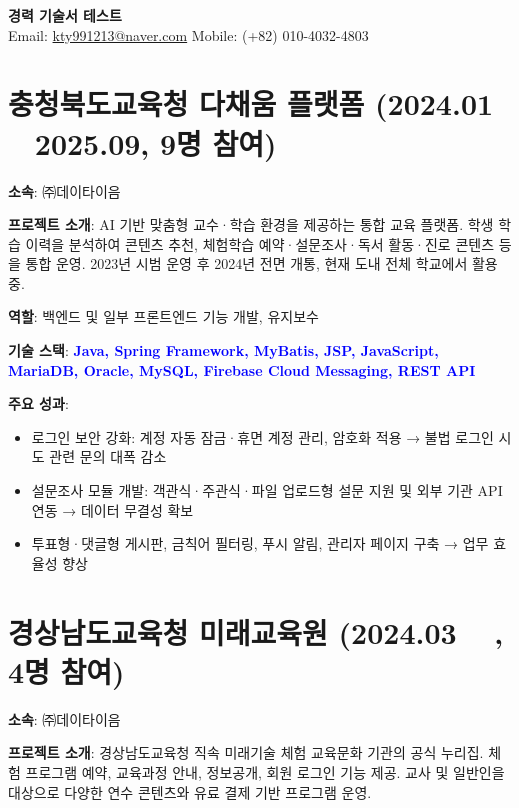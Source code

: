 \documentclass[a4paper,11pt]{article}
\newcommand{\tech}[1]{\textbf{\textcolor{blue}{#1}}}
\begin{document}
\begin{center}
    {\LARGE \textbf{경력 기술서 테스트}} \\[6pt]
    Email: \href{mailto:kty991213@naver.com}{kty991213@naver.com} \quad
    Mobile: (+82) 010-4032-4803
\end{center}



\section{충청북도교육청 다채움 플랫폼 (2024.01 ~ 2025.09, 9명 참여)}

\textbf{소속}: ㈜데이타이음

\textbf{프로젝트 소개}:  
AI 기반 맞춤형 교수·학습 환경을 제공하는 통합 교육 플랫폼.  
학생 학습 이력을 분석하여 콘텐츠 추천, 체험학습 예약·설문조사·독서 활동·진로 콘텐츠 등을 통합 운영.  
2023년 시범 운영 후 2024년 전면 개통, 현재 도내 전체 학교에서 활용 중.

\textbf{역할}: 백엔드 및 일부 프론트엔드 기능 개발, 유지보수

\textbf{기술 스택}: \tech{Java, Spring Framework, MyBatis, JSP, JavaScript, MariaDB, Oracle, MySQL, Firebase Cloud Messaging, REST API}

\textbf{주요 성과}:
\begin{itemize}[leftmargin=*]
  \item 로그인 보안 강화: 계정 자동 잠금·휴면 계정 관리, 암호화 적용 → 불법 로그인 시도 관련 문의 대폭 감소
  \item 설문조사 모듈 개발: 객관식·주관식·파일 업로드형 설문 지원 및 외부 기관 API 연동 → 데이터 무결성 확보
  \item 투표형·댓글형 게시판, 금칙어 필터링, 푸시 알림, 관리자 페이지 구축 → 업무 효율성 향상
\end{itemize}

\section{경상남도교육청 미래교육원 (2024.03 ~ , 4명 참여)}

\textbf{소속}: ㈜데이타이음

\textbf{프로젝트 소개}:  
경상남도교육청 직속 미래기술 체험 교육문화 기관의 공식 누리집.  
체험 프로그램 예약, 교육과정 안내, 정보공개, 회원 로그인 기능 제공.  
교사 및 일반인을 대상으로 다양한 연수 콘텐츠와 유료 결제 기반 프로그램 운영.
\end{document}
